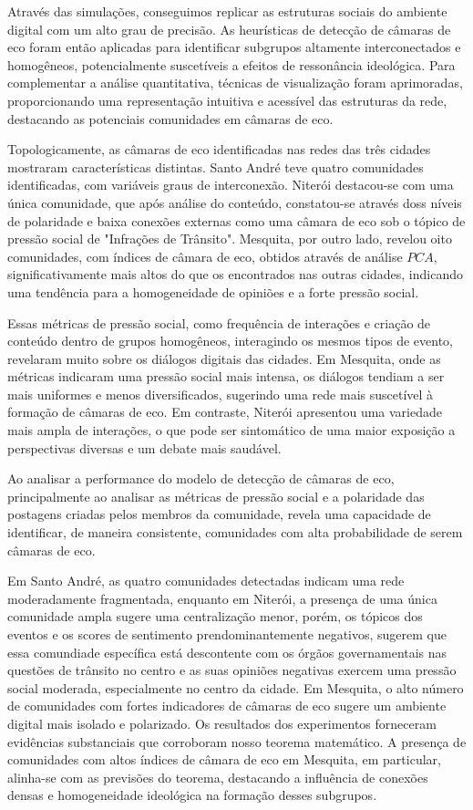 Através das simulações, conseguimos replicar as estruturas sociais do ambiente digital com um alto grau de precisão. As heurísticas de detecção de câmaras de eco foram então aplicadas para identificar subgrupos altamente interconectados e homogêneos, potencialmente suscetíveis a efeitos de ressonância ideológica. Para complementar a análise quantitativa, técnicas de visualização foram aprimoradas, proporcionando uma representação intuitiva e acessível das estruturas da rede, destacando as potenciais comunidades em câmaras de eco.

Topologicamente, as câmaras de eco identificadas nas redes das três cidades mostraram características distintas. Santo André teve quatro comunidades identificadas, com variáveis graus de interconexão. Niterói destacou-se com uma única comunidade, que após análise do conteúdo, constatou-se através doss níveis de polaridade e baixa conexões externas como uma câmara de eco sob o tópico de pressão social  de "Infrações de Trânsito". Mesquita, por outro lado, revelou oito comunidades, com índices de câmara de eco, obtidos através de análise $PCA$, significativamente mais altos do que os encontrados nas outras cidades, indicando uma tendência para a homogeneidade de opiniões e a forte pressão social.

Essas métricas de pressão social, como frequência de interações e criação de conteúdo dentro de grupos homogêneos, interagindo os mesmos tipos de evento, revelaram muito sobre os diálogos digitais das cidades. Em Mesquita, onde as métricas indicaram uma pressão social mais intensa, os diálogos tendiam a ser mais uniformes e menos diversificados, sugerindo uma rede mais suscetível à formação de câmaras de eco. Em contraste, Niterói apresentou uma variedade mais ampla de interações, o que pode ser sintomático de uma maior exposição a perspectivas diversas e um debate mais saudável.

Ao analisar a performance do modelo de detecção de câmaras de eco, principalmente ao analisar as métricas de pressão social e a polaridade das postagens criadas pelos membros da comunidade, revela uma capacidade de identificar, de maneira consistente, comunidades com alta probabilidade de serem câmaras de eco.

Em Santo André, as quatro comunidades detectadas indicam uma rede moderadamente fragmentada, enquanto em Niterói, a presença de uma única comunidade ampla sugere uma centralização menor, porém, os tópicos dos eventos e os scores de sentimento prendominantemente negativos, sugerem que essa comundiade específica está descontente com os órgãos governamentais nas questões de trânsito no centro e as suas opiniões negativas exercem uma pressão social moderada, especialmente no centro da cidade. Em Mesquita, o alto número de comunidades com fortes indicadores de câmaras de eco sugere um ambiente digital mais isolado e polarizado. Os resultados dos experimentos forneceram evidências substanciais que corroboram nosso teorema matemático. A presença de comunidades com altos índices de câmara de eco em Mesquita, em particular, alinha-se com as previsões do teorema, destacando a influência de conexões densas e homogeneidade ideológica na formação desses subgrupos.

